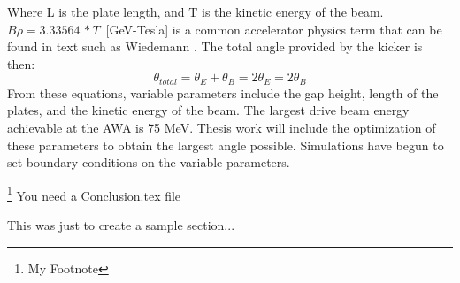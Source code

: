 \documentclass{iitthesis}
\begin{document}
Where L is the plate length, and T is the kinetic energy of the beam. $B\rho=3.33564\,*T\,$ [GeV-Tesla] is a 
common accelerator physics term that can be found in text such as Wiedemann \cite{Wiedemann}. 
The total angle provided by the kicker is then: 
\begin{equation}
\theta_{total}= \theta_E+\theta_B=2\theta_E=2\theta_B
\end{equation}
From these equations, variable parameters include the gap height, length of the plates, and 
the kinetic energy of the beam. The largest drive beam energy achievable at the AWA is 75 MeV. 
Thesis work will include the optimization of these parameters to obtain the largest angle possible.
Simulations have begun to set boundary conditions on the variable parameters. 





\footnote{My Footnote} 
%   
You need a Conclusion.tex file



This was just to create a sample section...

\clearpage


%
%
\appendix
\end{document}
